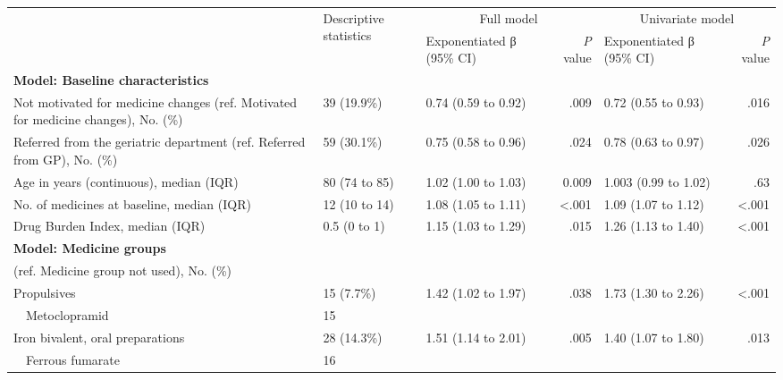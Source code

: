 \begin{table}[]
\begin{tabular}{m{7em}llrlr}
\toprule
\multirow{2}{*}{} &
  \multirow{2}{*}{Descriptive   statistics} &
  \multicolumn{2}{c}{Full model} &
  \multicolumn{2}{c}{Univariate model} \\ \cmidrule(l){3-6} 
                                           &             & Exponentiated   β (95\% CI) & \textit{P} value & Exponentiated β (95\% CI) & \textit{P} value        \\ \cmidrule(r){1-2}
{\textbf{Model:   Baseline characteristics}} & & & & & \\
Not motivated for medicine changes (ref.   Motivated for medicine changes), No. (\%) &
  39 (19.9\%) &
  0.74 (0.59 to 0.92) &
  .009 &
  0.72 (0.55 to 0.93) &
  .016 \\
Referred from the geriatric department   (ref. Referred from GP), No. (\%) &
  59 (30.1\%) &
  0.75 (0.58 to 0.96) &
  .024 &
  0.78 (0.63 to 0.97) &
  .026 \\
Age in years   (continuous), median (IQR) &
  80 (74 to 85) &
  1.02 (1.00 to 1.03) &
  0.009 &
  1.003 (0.99 to 1.02) &
  .63 \\
No. of medicines at baseline, median (IQR) &
  12 (10 to 14) &
  1.08 (1.05 to 1.11) &
  \textless .001 &
  1.09 (1.07 to 1.12) &
  \textless .001 \\
Drug Burden Index, median (IQR) &
  0.5 (0 to 1) &
  1.15 (1.03 to 1.29) &
  .015 &
  1.26 (1.13 to 1.40) &
  \textless .001 \\
\textbf{Model: Medicine   groups} &
  \multirow{2}{*}{} &
  \multirow{2}{*}{} &
  \multirow{2}{*}{} &
  \multirow{2}{*}{} &
  \multirow{2}{*}{} \\
(ref. Medicine   group not used), No. (\%) &             &                             &         &                           &                \\
Propulsives                                & 15 (7.7\%)  & 1.42 (1.02 to 1.97)         & .038    & 1.73 (1.30 to 2.26)       & \textless .001 \\
~~Metoclopramid                              & 15          &                             &         &                           &                \\
Iron bivalent, oral preparations           & 28 (14.3\%) & 1.51 (1.14 to 2.01)         & .005    & 1.40 (1.07 to 1.80)       & .013           \\
~~Ferrous fumarate                           & 16          &                             &         &                           &                \\

\end{tabular}
\end{table}
